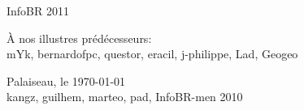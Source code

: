 \thispagestyle{empty}

\begin{center}
\begin{Huge}
InfoBR 2011
\end{Huge}
\end{center}


\begin{flushright}
\begin{large} 
 { \selectfont
\`A nos illustres pr\'ed\'ecesseurs:\\
\smallskip
mYk, bernardofpc, questor, eracil, j-philippe, Lad, Geogeo \\ }
\end{large}
\vspace{1cm}
{Palaiseau, le \today \\
\medskip
 kangz, guilhem, marteo, pad, InfoBR-men 2010  }
\end{flushright} 



\newpage
\thispagestyle{empty}
\vspace*{1cm}
\newpage
